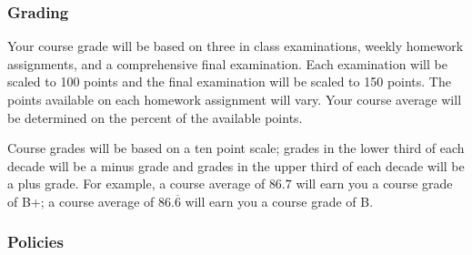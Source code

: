 \documentclass[12pt,fullpage]{article}
\newcounter{ex}\setcounter{ex}{0}
\begin{document}
\subsubsection*{Grading}

Your course grade will be based on three in class examinations, weekly homework assignments, and a comprehensive final examination. Each
examination will be scaled to 100 points and the final examination will be scaled to 150 points.  The points available on each homework
assignment will vary.  Your course average will be determined on the percent of the available points.

Course grades will be based on a ten point scale; grades in the lower third of each decade will be a minus grade and grades in the
upper third of each decade will be a plus grade. For example, a course average of \(86.7\) will earn you a course grade of B+; a course average
of \(86.\overline{6}\) will earn you a course grade of B.

\subsubsection* {Policies}
\end{document}
